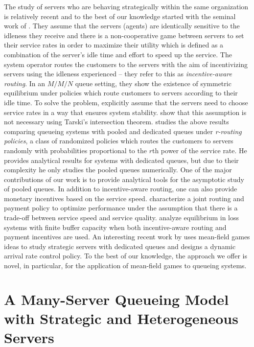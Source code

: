 \documentclass[a4paper,11pt,twoside]{article}
\numberwithin{equation}{section}
\numberwithin{figure}{section}
\theoremstyle{plain}
\newcommand{\1}{\mathbbm{1}}
\begin{document}
The study of  servers who are behaving strategically within the same organization is relatively recent and to the best of our knowledge started with the seminal work of \cite{Gopalakrishnan_etal2016}. They assume that the servers (agents) are identically sensitive to the idleness they receive and there is a non-cooperative game between servers to set their service rates in order to maximize their utility which is defined as a combination of the server's idle time and effort to speed up the service. The system operator routes the customers to the servers with the aim of incentivizing servers using the idleness experienced -- they refer to this as \emph{incentive-aware routing}. In an $M/M/N$ queue setting, they show the existence of symmetric equilibrium under policies which route customers to servers according to their idle time. To solve the problem, \cite{Gopalakrishnan_etal2016} explicitly assume that the servers need to choose service rates in a way that ensures system stability. \cite{armony2021capacity} show that this assumption is not necessary using Tarski's intersection theorem. \cite{gopalakrishnan2021} studies the above results comparing queueing systems with pooled and dedicated queues under \emph{r-routing policies}, a class of randomized policies which routes the customers to servers randomly with probabilities proportional to the $r$th power of the service rate. He provides analytical results for systems with dedicated queues, but due to their complexity he only studies the pooled queues numerically. One of the major contributions of our work is to provide analytical tools for the asymptotic study of pooled queues. In addition to incentive-aware routing, one can also provide monetary incentives based on the service speed. \cite{zhan2019staffing} characterize a joint routing and payment policy to optimize performance under the assumption that there is a trade-off between service speed and service quality. \cite{zhong2021} analyze equilibrium in loss systems with finite buffer capacity when both incentive-aware routing and payment incentives are used. 
An interesting recent work by \cite{Bayraktar2019} uses mean-field games ideas to study strategic servers with dedicated queues and designs a dynamic arrival rate control policy. 
To the best of our knowledge, the approach we offer is novel, in particular, for the application of mean-field games to queueing systems. 

\section{A Many-Server Queueing Model with Strategic and Heterogeneous Servers}\label{sec:setting}
\end{document}
